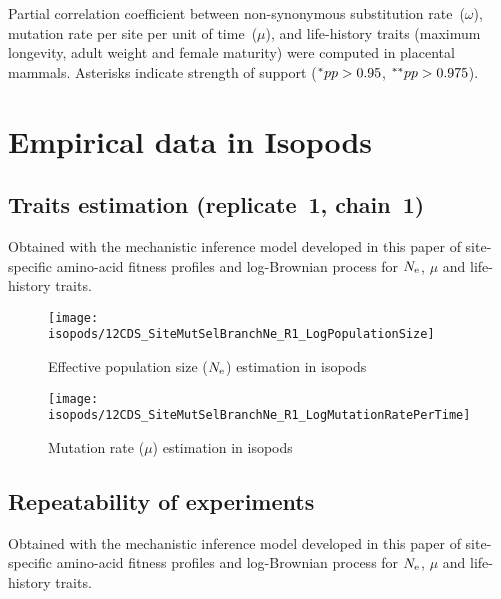 \begin{table}[H]
    
    \caption[Partial correlation coefficient matrix in mammals ($\omega$)]{
    Partial correlation coefficient between non-synonymous substitution rate~($\omega$), mutation rate per site per unit of time~($\mu$), and life-history traits (maximum longevity, adult weight and female maturity) were computed in placental mammals.
    Asterisks indicate strength of support ($\smash{^{*}} pp > 0.95$, $\smash{^{**}} pp > 0.975$).}
\end{table}


\section{Empirical data in Isopods}
\label{sec:empirical-data-in-isopods}

\subsection{Traits estimation (replicate~1, chain~1)}
Obtained with the mechanistic inference model developed in this paper of site-specific amino-acid fitness profiles and log-Brownian process for $\Ne$, $\mu$ and life-history traits.

\begin{figure}[H]
    \centering
    \texttt{[image: isopods/12CDS\_SiteMutSelBranchNe\_R1\_LogPopulationSize]}
    \caption[$\Ne$ estimation in isopods]{Effective population size ($\Ne$) estimation in isopods}
\end{figure}

\begin{figure}[H]
    \centering
    \texttt{[image: isopods/12CDS\_SiteMutSelBranchNe\_R1\_LogMutationRatePerTime]}
    \caption[Mutation rate estimation in isopods]{Mutation rate ($\mu$) estimation in isopods}
\end{figure}

\subsection{Repeatability of experiments}
Obtained with the mechanistic inference model developed in this paper of site-specific amino-acid fitness profiles and log-Brownian process for $\Ne$, $\mu$ and life-history traits.

